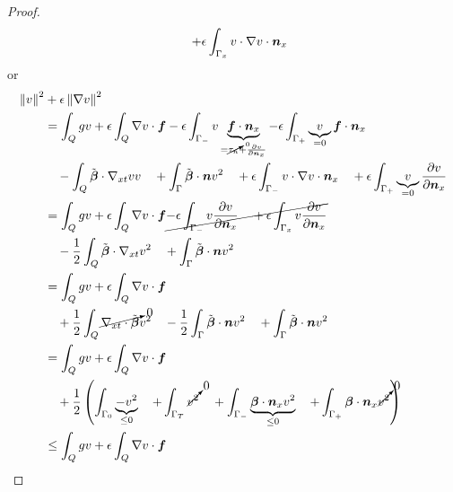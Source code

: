 \documentclass{article}
\begin{document}
\begin{proof}
\begin{align*}
\quad+\epsilon\int_{\Gamma_x}v\cdot\nabla v\cdot\boldsymbol n_x
\end{align*}
or
\begin{align*}
\left\| v \right\|^2
&+\epsilon\left\| \nabla v \right\|^2
\\
&=
\int_Qgv
+\epsilon\int_Q\nabla v\cdot\boldsymbol f
-\epsilon\int_{\Gamma_-}v\underbrace{\boldsymbol f\cdot\boldsymbol n_x}_{=\cancelto{0}{\tau_n}+\frac{\partial v}{\partial\boldsymbol n_x}}
-\epsilon\int_{\Gamma_+}\underbrace{v}_{=0}\boldsymbol f\cdot\boldsymbol n_x\\
&\quad-\int_Q\tilde{\boldsymbol\beta}\cdot\nabla_{xt} vv
\quad+\int_\Gamma \tilde{\boldsymbol\beta}\cdot\boldsymbol n v^2
\quad+\epsilon\int_{\Gamma_-}v\cdot\nabla v\cdot\boldsymbol n_x
\quad+\epsilon\int_{\Gamma_+}\underbrace{v}_{=0}\frac{\partial v}{\partial\boldsymbol n_x}
\\
&=
\int_Qgv
+\epsilon\int_Q\nabla v\cdot\boldsymbol f
\cancel{
-\epsilon\int_{\Gamma_-}v\frac{\partial v}{\partial\boldsymbol n_x}
\quad+\epsilon\int_{\Gamma_x}v\frac{\partial v}{\partial\boldsymbol n_x}
}\\
&\quad-\frac{1}{2}\int_Q\tilde{\boldsymbol\beta}\cdot\nabla_{xt} v^2
\quad+\int_\Gamma \tilde{\boldsymbol\beta}\cdot\boldsymbol n v^2
\\
&=
\int_Qgv
+\epsilon\int_Q\nabla v\cdot\boldsymbol f\\
&\quad+\frac{1}{2}\int_Q\cancelto{0}{\nabla_{xt}\cdot\tilde{\boldsymbol\beta}} v^2
\quad-\frac{1}{2}\int_\Gamma\tilde{\boldsymbol\beta}\cdot\boldsymbol n v^2
\quad+\int_\Gamma \tilde{\boldsymbol\beta}\cdot\boldsymbol n v^2
\\
&=
\int_Qgv
+\epsilon\int_Q\nabla v\cdot\boldsymbol f\\
&\quad+\frac{1}{2}\left( \int_{\Gamma_0} \underbrace{-v^2}_{\leq 0}
\quad+\int_{\Gamma_T} \cancelto{0}{v^2}
\quad+\int_{\Gamma_-} \underbrace{\boldsymbol\beta\cdot\boldsymbol n_x v^2}_{\leq 0}
\quad+\int_{\Gamma_+} \boldsymbol\beta\cdot\boldsymbol n_x \cancelto{0}{v^2}
 \right)
\\
&\leq
\int_Qgv
+\epsilon\int_Q\nabla v\cdot\boldsymbol f
\end{align*}


\end{proof}
\end{document}
